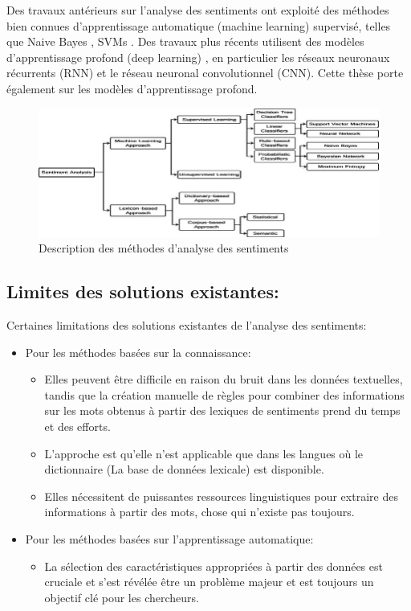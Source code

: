 Des travaux antérieurs sur l'analyse des sentiments ont exploité des méthodes bien connues d'apprentissage automatique (machine learning) supervisé, telles que Naive Bayes \cite{martinez2006learning}, SVMs \cite{vinet2011missing, ho1995random,wahid2017prestasi}. Des travaux plus récents utilisent des modèles d'apprentissage profond (deep learning) \cite{goldberg2017neural}, en particulier les réseaux neuronaux récurrents (RNN) et le réseau neuronal convolutionnel (CNN). Cette thèse porte également sur les modèles d'apprentissage profond.
\begin{figure}[H]
    \centering
    \includegraphics[width=\textwidth]{etude-theorique-conception/assets/sentiment-analysis-methods.jpg}
    \caption{Description des méthodes d'analyse des sentiments}
    \label{fig:my_label}
\end{figure}
\subsection{Limites des solutions existantes:}
Certaines limitations des solutions existantes de l'analyse des sentiments:
\begin{itemize}
    \item \textcolor{DispositionColor}{Pour les méthodes basées sur la connaissance:}
    \begin{itemize}
        \item Elles peuvent être difficile en raison du bruit dans les données textuelles, tandis que la création manuelle de règles pour combiner des informations sur les mots obtenus à partir des lexiques de sentiments prend du temps et des efforts.
        \item L'approche est qu'elle n'est applicable que dans les langues où le dictionnaire (La base de données lexicale) est disponible.
        \item Elles nécessitent de puissantes ressources linguistiques pour extraire des informations à partir des mots, chose qui n'existe pas toujours.
    \end{itemize}
    \item \textcolor{DispositionColor}{Pour les méthodes basées sur l'apprentissage automatique:}
    \begin{itemize}
        \item La sélection des caractéristiques appropriées à partir des données est cruciale et s'est révélée être un problème majeur et est toujours un objectif clé pour les chercheurs.
    \end{itemize}
\end{itemize}  
